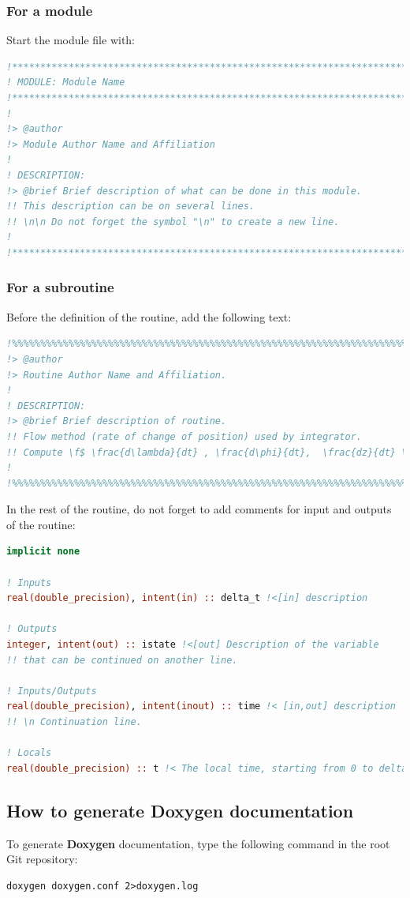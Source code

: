 \documentclass[english,a4paper,twoside]{article}
\begin{document}
\subsubsection{For a module}
Start the module file with:
\begin{lstlisting}[language=Fortran]
!******************************************************************************
! MODULE: Module Name
!******************************************************************************
!
!> @author
!> Module Author Name and Affiliation
!
! DESCRIPTION: 
!> @brief Brief description of what can be done in this module. 
!! This description can be on several lines. 
!! \n\n Do not forget the symbol "\n" to create a new line.
!
!******************************************************************************
\end{lstlisting}

\subsubsection{For a subroutine}
Before the definition of the routine, add the following text:
\begin{lstlisting}[language=Fortran]
!%%%%%%%%%%%%%%%%%%%%%%%%%%%%%%%%%%%%%%%%%%%%%%%%%%%%%%%%%%%%%%%%%%%%%%%%%%%
!> @author 
!> Routine Author Name and Affiliation.
!
! DESCRIPTION: 
!> @brief Brief description of routine. 
!! Flow method (rate of change of position) used by integrator.
!! Compute \f$ \frac{d\lambda}{dt} , \frac{d\phi}{dt},  \frac{dz}{dt} \f$ }
!
!%%%%%%%%%%%%%%%%%%%%%%%%%%%%%%%%%%%%%%%%%%%%%%%%%%%%%%%%%%%%%%%%%%%%%%%%%%% 
\end{lstlisting}

In the rest of the routine, do not forget to add comments for input and outputs of the routine: 
\begin{lstlisting}[language=Fortran]
implicit none

! Inputs
real(double_precision), intent(in) :: delta_t !<[in] description

! Outputs
integer, intent(out) :: istate !<[out] Description of the variable
!! that can be continued on another line.

! Inputs/Outputs
real(double_precision), intent(inout) :: time !< [in,out] description
!! \n Continuation line. 

! Locals
real(double_precision) :: t !< The local time, starting from 0 to delta_t
\end{lstlisting}

\subsection{How to generate Doxygen documentation}
To generate \textbf{Doxygen} documentation, type the following command in the root Git repository:
\begin{verbatim}
doxygen doxygen.conf 2>doxygen.log
\end{verbatim}
\end{document}
